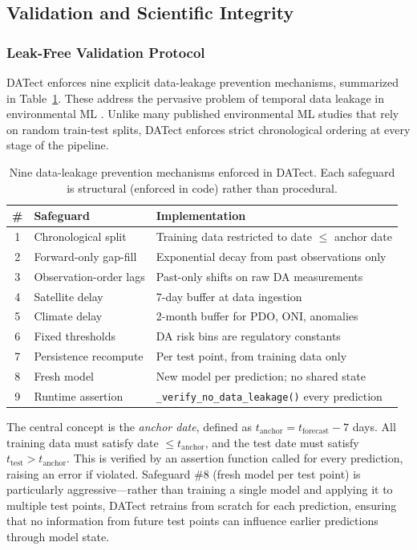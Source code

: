 \documentclass[toxins,article,submit,moreauthors]{Definitions/mdpi}
\begin{document}
\subsection{Validation and Scientific Integrity}
\label{sec:validation}

\subsubsection{Leak-Free Validation Protocol}

DATect enforces nine explicit data-leakage prevention mechanisms, summarized in Table~\ref{tab:leakage-safeguards}. These address the pervasive problem of temporal data leakage in environmental ML \cite{Kapoor2023, Roberts2017}. Unlike many published environmental ML studies that rely on random train-test splits, DATect enforces strict chronological ordering at every stage of the pipeline.

\begin{table}[H]
\caption{Nine data-leakage prevention mechanisms enforced in DATect. Each safeguard is structural (enforced in code) rather than procedural.}
\label{tab:leakage-safeguards}
\centering\footnotesize
\begin{tabularx}{\linewidth}{clX}
\toprule
\textbf{\#} & \textbf{Safeguard} & \textbf{Implementation} \\
\midrule
1 & Chronological split & Training data restricted to date $\leq$ anchor date \\
2 & Forward-only gap-fill & Exponential decay from past observations only \\
3 & Observation-order lags & Past-only shifts on raw DA measurements \\
4 & Satellite delay & 7-day buffer at data ingestion \\
5 & Climate delay & 2-month buffer for PDO, ONI, anomalies \\
6 & Fixed thresholds & DA risk bins are regulatory constants \\
7 & Persistence recompute & Per test point, from training data only \\
8 & Fresh model & New model per prediction; no shared state \\
9 & Runtime assertion & \texttt{\_verify\_no\_data\_leakage()} every prediction \\
\bottomrule
\end{tabularx}
\end{table}

The central concept is the \textit{anchor date}, defined as $t_{\text{anchor}} = t_{\text{forecast}} - 7$ days. All training data must satisfy date $\leq t_{\text{anchor}}$, and the test date must satisfy $t_{\text{test}} > t_{\text{anchor}}$. This is verified by an assertion function called for every prediction, raising an error if violated. Safeguard \#8 (fresh model per test point) is particularly aggressive---rather than training a single model and applying it to multiple test points, DATect retrains from scratch for each prediction, ensuring that no information from future test points can influence earlier predictions through model state.
\end{document}
